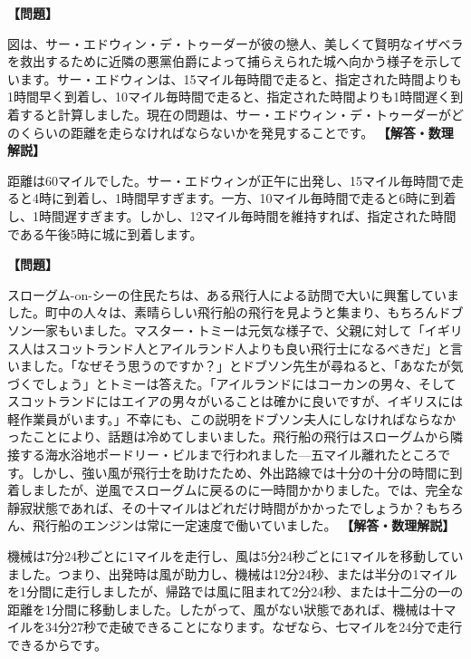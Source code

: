 \documentclass[10pt,a4paper,oneside,openany]{ltjsbook}
\begin{document}
\begin{tcolorbox}[colback=softblue,colframe=primaryblue,title=\textbf{第 71 問：サー・エドウィン・デ・トゥーダー （原題: SIR EDWYN DE TUDOR.）},arc=2mm,boxrule=1pt,breakable]
\textbf{【問題】}\par\vspace{0.3em}
図は、サー・エドウィン・デ・トゥーダーが彼の戀人、美しくて賢明なイザベラを救出するために近隣の悪黨伯爵によって捕らえられた城へ向かう様子を示しています。サー・エドウィンは、15マイル毎時間で走ると、指定された時間よりも1時間早く到着し、10マイル毎時間で走ると、指定された時間よりも1時間遅く到着すると計算しました。現在の問題は、サー・エドウィン・デ・トゥーダーがどのくらいの距離を走らなければならないかを発見することです。
\tcblower
\textbf{【解答・数理解説】}\par\vspace{0.3em}
距離は60マイルでした。サー・エドウィンが正午に出発し、15マイル毎時間で走ると4時に到着し、1時間早すぎます。一方、10マイル毎時間で走ると6時に到着し、1時間遅すぎます。しかし、12マイル毎時間を維持すれば、指定された時間である午後5時に城に到着します。
\end{tcolorbox}

\begin{tcolorbox}[colback=softblue,colframe=primaryblue,title=\textbf{第 72 問：飛行船の問題 （原題: THE HYDROPLANE QUESTION.）},arc=2mm,boxrule=1pt,breakable]
\textbf{【問題】}\par\vspace{0.3em}
スローグム-on-シーの住民たちは、ある飛行人による訪問で大いに興奮していました。町中の人々は、素晴らしい飛行船の飛行を見ようと集まり、もちろんドブソン一家もいました。マスター・トミーは元気な様子で、父親に対して「イギリス人はスコットランド人とアイルランド人よりも良い飛行士になるべきだ」と言いました。「なぜそう思うのですか？」とドブソン先生が尋ねると、「あなたが気づくでしょう」とトミーは答えた。「アイルランドにはコーカンの男々、そしてスコットランドにはエイアの男々がいることは確かに良いですが、イギリスには軽作業員がいます。」不幸にも、この説明をドブソン夫人にしなければならなかったことにより、話題は冷めてしまいました。飛行船の飛行はスローグムから隣接する海水浴地ポードリー・ビルまで行われました—五マイル離れたところです。しかし、強い風が飛行士を助けたため、外出路線では十分の十分の時間に到着しましたが、逆風でスローグムに戻るのに一時間かかりました。では、完全な靜寂狀態であれば、その十マイルはどれだけ時間がかかったでしょうか？もちろん、飛行船のエンジンは常に一定速度で働いていました。
\tcblower
\textbf{【解答・数理解説】}\par\vspace{0.3em}
機械は7分24秒ごとに1マイルを走行し、風は5分24秒ごとに1マイルを移動していました。つまり、出発時は風が助力し、機械は12分24秒、または半分の1マイルを1分間に走行しましたが、帰路では風に阻まれて2分24秒、または十二分の一の距離を1分間に移動しました。したがって、風がない狀態であれば、機械は十マイルを34分27秒で走破できることになります。なぜなら、七マイルを24分で走行できるからです。
\end{tcolorbox}
\end{document}

